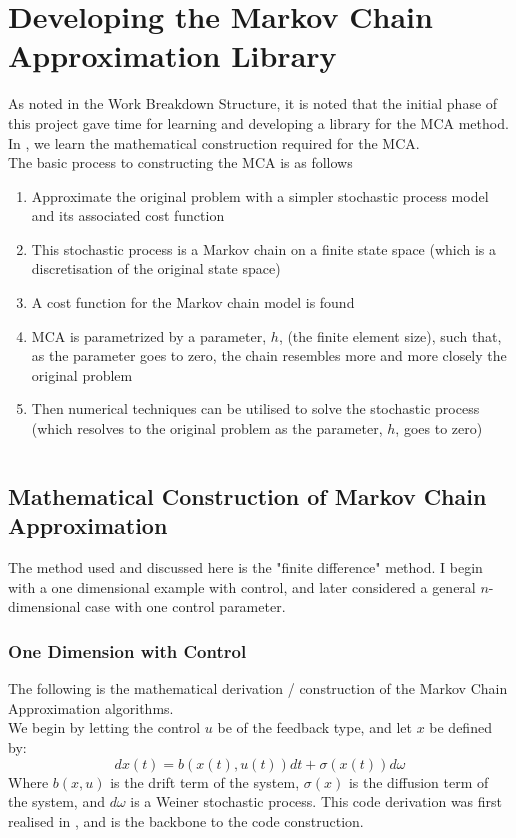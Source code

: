 \documentclass[11pt,draftd]{article}
\begin{document}
\section{Developing the Markov Chain Approximation Library}
As noted in the Work Breakdown Structure, it is noted that the initial phase of this project gave time for learning and developing a library for the MCA method. In \cite{kushner}, we learn the mathematical construction required for the MCA.  \\

The basic process to constructing the MCA is as follows
\begin{enumerate}
	\item Approximate the original problem with a simpler stochastic process model and its associated cost function
	\item This stochastic process is a Markov chain on a finite state space (which is a discretisation of the original state space)
	\item A cost function for the Markov chain model is found
	\item MCA is parametrized by a parameter, $ h $, (the finite element size), such that, as the parameter goes to zero, the chain resembles more and more closely the original problem
	\item Then numerical techniques can be utilised to solve the stochastic process (which resolves to the original problem as the parameter, $ h $, goes to zero)
\end{enumerate}
\[\]
\subsection{Mathematical Construction of Markov Chain Approximation}
The method used and discussed here is the "finite difference" method. I begin with a one dimensional example with control, and later considered a general $ n $-dimensional case with one control parameter.

\subsubsection{One Dimension with Control}
The following is the mathematical derivation / construction of the Markov Chain Approximation algorithms. \\

We begin by letting the control $ u $ be of the feedback type, and let $ x $ be defined by:
\begin{equation}\label{Eq_PduDefinition1D}
	dx(t) = b(x(t),u(t)) dt + \sigma(x(t))d\omega
\end{equation}
Where $ b(x,u) $ is the drift term of the system, $ \sigma(x) $ is the diffusion term of the system, and $ d\omega $ is a Weiner stochastic process. This code derivation was first realised in \cite{kushner}, and is the backbone to the code construction. \\
\end{document}
